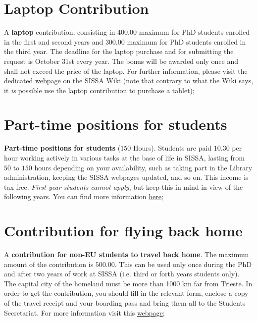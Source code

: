 \documentclass{sissavademecum}
\begin{document}
   \section{Laptop Contribution} 
   A \textbf{laptop} contribution, consisting in \EUR{} $400.00$ maximum for PhD students enrolled in the first and second years and \EUR{} $300.00$ maximum for PhD students enrolled in the third year. The deadline for the laptop purchase and for submitting the request is October $31$st every year. The bonus will be awarded only once and shall not exceed the price of the laptop. For further information, please visit the dedicated \href{http://wiki.sissa.it/students/index.php/Laptop_contribution}{webpage} on the SISSA Wiki (note that contrary to what the Wiki says, it \emph{is} possible use the laptop contribution to purchase a tablet);
    

   
   \section{Part-time positions for students} \textbf{Part-time positions for students }($150$ Hours). Students are paid \EUR{} $10.30$ per hour working actively in various tasks at the base of life in SISSA, lasting from $50$ to $150$ hours depending on your availability, such as taking part in the Library administration, keeping the SISSA webpages updated, and so on. This income is tax-free. \textit{First year students cannot apply}, but keep this in mind in view of the following years. You can find more information \href{http://wiki.sissa.it/students/index.php/150_hours}{here};
    
    \section{Contribution for flying back home}
    A \textbf{contribution for non-EU students to travel back home}. The maximum amount of the contribution is \EUR{} $500.00$. This can be used only once during the PhD and after two years of work at SISSA (i.e. third or forth years students only). The capital city of the homeland must be more than 1000 km far from Trieste. In order to get the contribution, you should fill in the relevant form, enclose a copy of the travel receipt and your boarding pass and bring them all to the Students Secretariat. For more information visit this \href{http://wiki.sissa.it/students/index.php/Travel_grant_contribution}{webpage};
    
   
\end{document}
